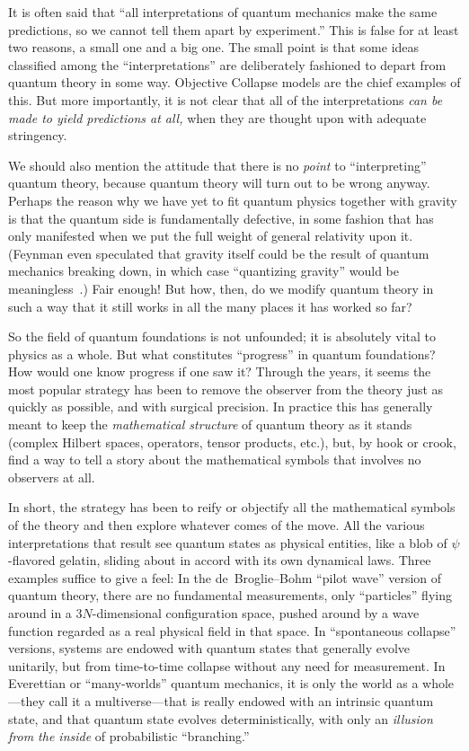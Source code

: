 \documentclass[aps,pra,superscriptaddress,10pt,tightenlines,twocolumn,nofootinbib]{revtex4}
\begin{document}
It is often said that ``all interpretations of quantum mechanics make the same predictions, so we cannot tell them apart by experiment.''  This is false for at least two reasons, a small one and a big one.  The small point is that some ideas classified among the ``interpretations'' are deliberately fashioned to depart from quantum theory in some way.  Objective Collapse models are the chief examples of this.  But more importantly, it is not clear that all of the interpretations {\it can be made to yield predictions at all,} when they are thought upon with adequate stringency.

We should also mention the attitude that there is no {\it point\/} to ``interpreting'' quantum theory, because quantum theory will turn out to be wrong anyway.  Perhaps the reason why we have yet to fit quantum physics together with gravity is that the quantum side is fundamentally defective, in some fashion that has only manifested when we put the full weight of general relativity upon it.  (Feynman even speculated that gravity itself could be the result of quantum mechanics breaking down, in which case ``quantizing gravity'' would be meaningless~\cite{Feynman03}.)  Fair enough!  But how, then, do we modify quantum theory in such a way that it still works in all the many places it has worked so far?

So the field of quantum foundations is not unfounded; it is absolutely vital to physics as a whole.  But what constitutes ``progress'' in quantum foundations?  How would one know progress if one saw it?  Through the years, it seems the most popular strategy has been to remove the observer from the theory just as quickly as possible, and with surgical precision.  In practice this has generally meant to keep the {\it mathematical structure\/} of quantum theory as it stands (complex Hilbert spaces, operators, tensor products, etc.), but, by hook or crook, find a way to tell a story about the mathematical symbols that involves no observers at all.

In short, the strategy has been to reify or objectify all the
mathematical symbols of the theory and then explore whatever comes of
the move.  All the various interpretations that result see quantum states
as physical entities, like a blob of $\psi$-flavored gelatin, sliding
about in accord with its own dynamical laws.
Three examples suffice to give a feel:  In the
de~Broglie--Bohm ``pilot wave'' version of quantum theory, there are
no fundamental measurements, only ``particles'' flying around in a
$3N$-dimensional configuration space, pushed around by a wave function
regarded as a real physical field in that space.  In ``spontaneous
collapse'' versions, systems are endowed with quantum states that
generally evolve unitarily, but from time-to-time collapse without any
need for measurement.  In Everettian or ``many-worlds'' quantum
mechanics, it is only the world as a whole---they call it a
multiverse---that is really endowed with an intrinsic quantum state,
and that quantum state evolves deterministically, with only an {\it
  illusion from the inside\/} of probabilistic ``branching.''
\end{document}

